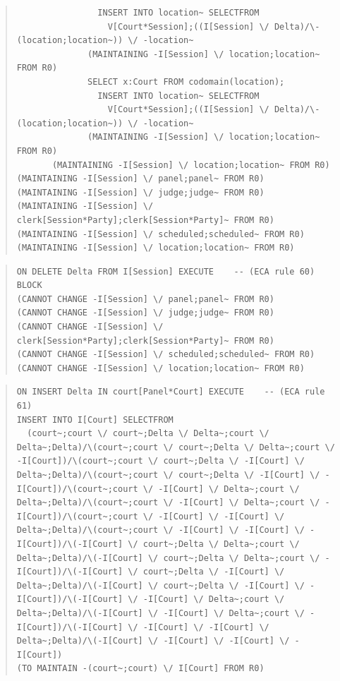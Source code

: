 \documentclass[10pt,a4paper]{report}              %
\theoremstyle{plain}\theorembodyfont{\rmfamily}\newtheorem{definition}{Definition}[section]
\theoremstyle{plain}\theorembodyfont{\rmfamily}\newtheorem{designrule}[definition]{Requirement}
\begin{document}
\begin{quote}
\begin{verbatim}
                INSERT INTO location~ SELECTFROM
                  V[Court*Session];((I[Session] \/ Delta)/\-(location;location~)) \/ -location~
              (MAINTAINING -I[Session] \/ location;location~ FROM R0)
              SELECT x:Court FROM codomain(location);
                INSERT INTO location~ SELECTFROM
                  V[Court*Session];((I[Session] \/ Delta)/\-(location;location~)) \/ -location~
              (MAINTAINING -I[Session] \/ location;location~ FROM R0)
       (MAINTAINING -I[Session] \/ location;location~ FROM R0)
(MAINTAINING -I[Session] \/ panel;panel~ FROM R0)
(MAINTAINING -I[Session] \/ judge;judge~ FROM R0)
(MAINTAINING -I[Session] \/ clerk[Session*Party];clerk[Session*Party]~ FROM R0)
(MAINTAINING -I[Session] \/ scheduled;scheduled~ FROM R0)
(MAINTAINING -I[Session] \/ location;location~ FROM R0)
\end{verbatim}
\end{quote}
\begin{quote}
\begin{verbatim}
ON DELETE Delta FROM I[Session] EXECUTE    -- (ECA rule 60)
BLOCK
(CANNOT CHANGE -I[Session] \/ panel;panel~ FROM R0)
(CANNOT CHANGE -I[Session] \/ judge;judge~ FROM R0)
(CANNOT CHANGE -I[Session] \/ clerk[Session*Party];clerk[Session*Party]~ FROM R0)
(CANNOT CHANGE -I[Session] \/ scheduled;scheduled~ FROM R0)
(CANNOT CHANGE -I[Session] \/ location;location~ FROM R0)
\end{verbatim}
\end{quote}
\begin{quote}
\begin{verbatim}
ON INSERT Delta IN court[Panel*Court] EXECUTE    -- (ECA rule 61)
INSERT INTO I[Court] SELECTFROM
  (court~;court \/ court~;Delta \/ Delta~;court \/ Delta~;Delta)/\(court~;court \/ court~;Delta \/ Delta~;court \/ -I[Court])/\(court~;court \/ court~;Delta \/ -I[Court] \/ Delta~;Delta)/\(court~;court \/ court~;Delta \/ -I[Court] \/ -I[Court])/\(court~;court \/ -I[Court] \/ Delta~;court \/ Delta~;Delta)/\(court~;court \/ -I[Court] \/ Delta~;court \/ -I[Court])/\(court~;court \/ -I[Court] \/ -I[Court] \/ Delta~;Delta)/\(court~;court \/ -I[Court] \/ -I[Court] \/ -I[Court])/\(-I[Court] \/ court~;Delta \/ Delta~;court \/ Delta~;Delta)/\(-I[Court] \/ court~;Delta \/ Delta~;court \/ -I[Court])/\(-I[Court] \/ court~;Delta \/ -I[Court] \/ Delta~;Delta)/\(-I[Court] \/ court~;Delta \/ -I[Court] \/ -I[Court])/\(-I[Court] \/ -I[Court] \/ Delta~;court \/ Delta~;Delta)/\(-I[Court] \/ -I[Court] \/ Delta~;court \/ -I[Court])/\(-I[Court] \/ -I[Court] \/ -I[Court] \/ Delta~;Delta)/\(-I[Court] \/ -I[Court] \/ -I[Court] \/ -I[Court])
(TO MAINTAIN -(court~;court) \/ I[Court] FROM R0)
\end{verbatim}
\end{quote}
\end{document}

